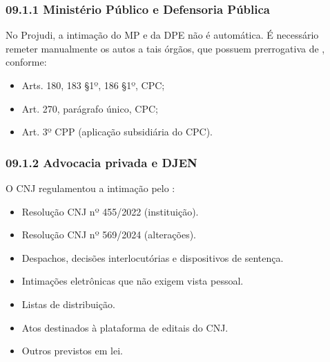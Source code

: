 \documentclass[letterpaper,10pt,brazil]{sphinxmanual}
\begin{document}
\subsubsection{09.1.1 \textendash{} Ministério Público e Defensoria Pública}
\label{\detokenize{08_5cienciasentenca:ministerio-publico-e-defensoria-publica}}
\sphinxAtStartPar
No Projudi, a intimação do MP e da DPE não é automática.
É necessário remeter manualmente os autos a tais órgãos, que possuem prerrogativa de , conforme:
\begin{itemize}
\item {} 
\sphinxAtStartPar
Arts. 180, 183 \S{}1º, 186 \S{}1º, CPC;

\item {} 
\sphinxAtStartPar
Art. 270, parágrafo único, CPC;

\item {} 
\sphinxAtStartPar
Art. 3º CPP (aplicação subsidiária do CPC).

\end{itemize}


\subsubsection{09.1.2 \textendash{} Advocacia privada e DJEN}
\label{\detokenize{08_5cienciasentenca:advocacia-privada-e-djen}}
\sphinxAtStartPar
O CNJ regulamentou a intimação pelo :
\begin{itemize}
\item {} 
\sphinxAtStartPar
Resolução CNJ nº 455/2022 (instituição).

\item {} 
\sphinxAtStartPar
Resolução CNJ nº 569/2024 (alterações).

\end{itemize}

\sphinxAtStartPar
{}
\begin{itemize}
\item {} 
\sphinxAtStartPar
Despachos, decisões interlocutórias e dispositivos de sentença.

\item {} 
\sphinxAtStartPar
Intimações eletrônicas que não exigem vista pessoal.

\item {} 
\sphinxAtStartPar
Listas de distribuição.

\item {} 
\sphinxAtStartPar
Atos destinados à plataforma de editais do CNJ.

\item {} 
\sphinxAtStartPar
Outros previstos em lei.

\end{itemize}
\end{document}
